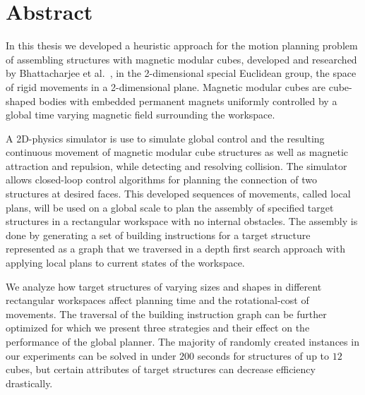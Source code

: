 \chapter*{Abstract}

In this thesis we developed a heuristic approach for the motion planning problem of assembling structures with magnetic modular cubes, developed and researched by Bhattacharjee et al.\ \cite{Bhattacharjee2022}, in the 2-dimensional special Euclidean group, the space of rigid movements in a 2-dimensional plane.
Magnetic modular cubes are cube-shaped bodies with embedded permanent magnets uniformly controlled by a global time varying magnetic field surrounding the workspace.

A 2D-physics simulator is use to simulate global control and the resulting continuous movement of magnetic modular cube structures as well as magnetic attraction and repulsion, while detecting and resolving collision.
The simulator allows closed-loop control algorithms for planning the connection of two structures at desired faces.
This developed sequences of movements, called local plans, will be used on a global scale to plan the assembly of specified target structures in a rectangular workspace with no internal obstacles.
The assembly is done by generating a set of building instructions for a target structure represented as a graph that we traversed in a depth first search approach with applying local plans to current states of the workspace.

We analyze how target structures of varying sizes and shapes in different rectangular workspaces affect planning time and the rotational-cost of movements.
The traversal of the building instruction graph can be further optimized for which we present three strategies and their effect on the performance of the global planner.
The majority of randomly created instances in our experiments can be solved in under $200$ seconds for structures of up to $12$ cubes, but certain attributes of target structures can decrease efficiency drastically.